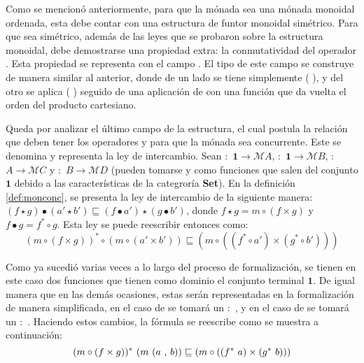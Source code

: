 Como se mencionó anteriormente, para que la mónada sea una mónada monoidal ordenada, esta debe contar con una estructura de funtor monoidal simétrico. Para que sea simétrico, además de las leyes que se probaron sobre la estructura monoidal, debe demostrarse una propiedad extra: la conmutatividad del operador . Esta propiedad se representa con el campo . El tipo de este campo se construye de manera similar al anterior, donde de un lado se tiene simplemente ( ), y del otro se aplica ( ) seguido de una aplicación de \AgdaField{$\gg=$} con una función que da vuelta el orden del producto cartesiano. 

Queda por analizar el último campo de la estructura, el cual postula la relación que deben tener los operadores \AgdaField{$\gg=$} y  para que la mónada sea concurrente. Este se denomina  y representa la ley de intercambio. Sean  $:$ $\mathbf{1} \rightarrow \mathcal{M} A$,  $:$ $\mathbf{1} \rightarrow \mathcal{M} B$,  $:$ $A \rightarrow \mathcal{M} C$ y  $:$ $B \rightarrow \mathcal{M} D$ (pueden tomarse  y  como funciones que salen del conjunto $\mathbf{1}$ debido a las características de la categroría \textbf{Set}). En la definición \ref{def:monconc}, se presenta la ley de intercambio de la siguiente manera: $(f \star g) \bullet (a' \star b') \sqsubseteq (f \bullet a') \star (g \bullet b')$, donde $f \star g = m \circ (f \times g)$ y $f \bullet g = f^* \circ g$. Esta ley se puede reescribir entonces como:
\begin{equation*}
(m \circ (f \times g))^* \circ (m \circ (a' \times b')) \sqsubseteq (m \circ ((f^* \circ a') \times (g^* \circ b')))
\end{equation*}

Como ya sucedió varias veces a lo largo del proceso de formalización, se tienen en este caso dos funciones que tienen como dominio el conjunto terminal $\mathbf{1}$. De igual manera que en las demás ocasiones, estas serán representadas en la formalización de manera simplificada, en el caso de  se tomará un  $:$ , y en el caso de  se tomará un  $:$ . Haciendo estos cambios, la fórmula se reescribe como se muestra a continuación:
\begin{equation*}
(m \circ (f \times g))^* \ (m\ (a\  \AgdaInductiveConstructor{,}\ b)) \sqsubseteq (m \circ ((f^*\ a) \times (g^*\ b)))
\end{equation*}

